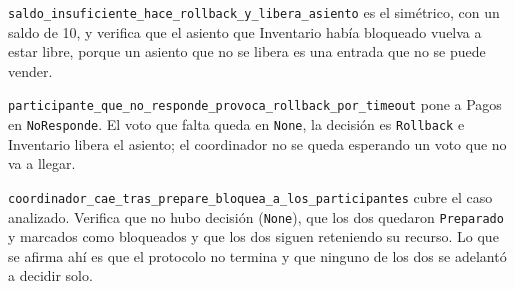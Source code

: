 \texttt{saldo\_insuficiente\_hace\_rollback\_y\_libera\_asiento} es el
simétrico, con un saldo de 10, y verifica que el asiento que Inventario
había bloqueado vuelva a estar libre, porque un asiento que no se libera es
una entrada que no se puede vender.

\texttt{participante\_que\_no\_responde\_provoca\_rollback\_por\_timeout}
pone a Pagos en \texttt{NoResponde}. El voto que falta queda en
\texttt{None}, la decisión es \texttt{Rollback} e Inventario libera el
asiento; el coordinador no se queda esperando un voto que no va a llegar.

\texttt{coordinador\_cae\_tras\_prepare\_bloquea\_a\_los\_participantes}
cubre el caso analizado. Verifica que no hubo decisión (\texttt{None}), que
los dos quedaron \texttt{Preparado} y marcados como bloqueados y que los dos
siguen reteniendo su recurso. Lo que se afirma ahí es que el protocolo no
termina y que ninguno de los dos se adelantó a decidir solo.
